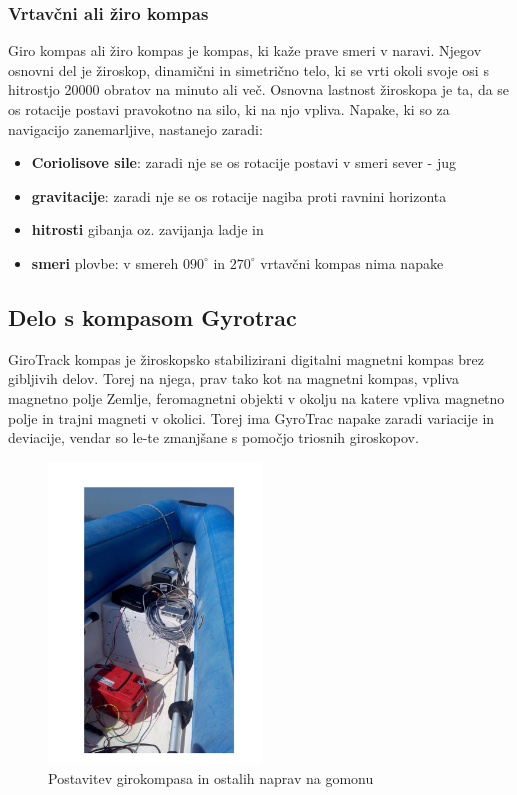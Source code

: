 \subsubsection{Vrtavčni ali žiro kompas}
Giro kompas ali žiro kompas je kompas, ki kaže prave smeri v naravi. Njegov osnovni del je žiroskop, dinamični in simetrično telo, ki se vrti okoli svoje osi s hitrostjo 20000 obratov na minuto ali več. Osnovna lastnost žiroskopa je ta, da se os rotacije postavi pravokotno na silo, ki na njo vpliva. Napake, ki so za navigacijo zanemarljive, nastanejo zaradi:
\begin{itemize}
	\item \textbf{Coriolisove sile}: zaradi nje se os rotacije postavi v smeri sever - jug
	\item \textbf{gravitacije}: zaradi nje se os rotacije nagiba proti ravnini horizonta
	\item \textbf{hitrosti} gibanja oz. zavijanja ladje in
	\item \textbf{smeri} plovbe: v smereh $090^{\circ}$ in $270^{\circ}$ vrtavčni kompas nima napake
\end{itemize}


\subsection{Delo s kompasom Gyrotrac}
GiroTrack kompas je žiroskopsko stabilizirani digitalni magnetni kompas brez gibljivih delov. Torej na njega, prav tako kot na magnetni kompas, vpliva magnetno polje Zemlje, feromagnetni objekti v okolju na katere vpliva magnetno polje in trajni magneti v okolici. Torej ima GyroTrac napake zaradi variacije in deviacije, vendar so le-te zmanjšane s pomočjo triosnih giroskopov.

\begin{figure}
	\centering
	\includegraphics[height=8cm]{Vaje/VzorecPoroc/figs/Postavitev_gumenjak.pdf}
	\caption{Postavitev girokompasa in ostalih naprav na gomonu}
	\label{fig:GT_gum}       %
\end{figure}

